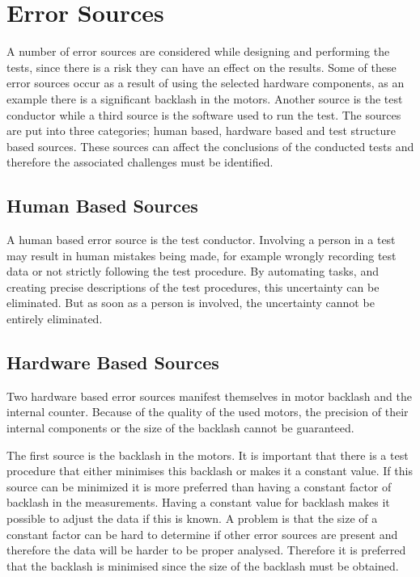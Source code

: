 \section{Error Sources}\label{sec:error_sources}
A number of error sources are considered while designing and performing the tests, since there is a risk they can have an effect on the results. Some of these error sources occur as a result of using the selected hardware components, as an example there is a significant backlash in the motors. Another source is the test conductor while a third source is the software used to run the test. The sources are put into three categories; human based, hardware based and test structure based sources. These sources can affect the conclusions of the conducted tests and therefore the associated challenges must be identified.

\subsection{Human Based Sources}
A human based error source is the test conductor. Involving a person in a test may result in human mistakes being made, for example wrongly recording test data or not strictly following the test procedure. By automating tasks, and creating precise descriptions of the test procedures, this uncertainty can be eliminated. But as soon as a person is involved, the uncertainty cannot be entirely eliminated.

\subsection{Hardware Based Sources}
Two hardware based error sources manifest themselves in motor backlash and the internal counter. Because of the quality of the used motors, the precision of their internal components or the size of the backlash cannot be guaranteed.

The first source is the backlash in the motors. It is important that there is a test procedure that either minimises this backlash or makes it a constant value. If this source can be minimized it is more preferred than having a constant factor of backlash in the measurements. Having a constant value for backlash makes it possible to adjust the data if this is known. A problem is that the size of a constant factor can be hard to determine if other error sources are present and therefore the data will be harder to be proper analysed. Therefore it is preferred that the backlash is minimised since the size of the backlash must be obtained.


